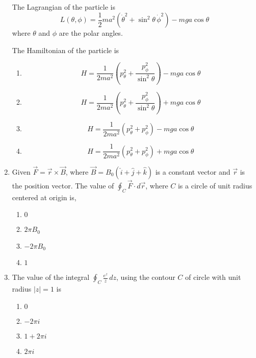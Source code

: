 \documentclass[article]{IEEEtran}
\numberwithin{figure}{enumi}
\begin{document}
\begin{enumerate}
    The Lagrangian of the particle is
    \begin{equation*}
    L(\theta, \phi) = \frac{1}{2} ma^2 \left( \dot{\theta}^2 + \sin^2 \theta \, \dot{\phi}^2 \right) - m g a \cos \theta
    \end{equation*}
    where $\theta$ and $\phi$ are the polar angles.
    
    The Hamiltonian of the particle is
    \begin{enumerate}
        \item 
        \begin{equation*}
        H = \frac{1}{2 m a^2} \left( p_{\theta}^2 + \frac{p_{\phi}^2}{\sin^2 \theta} \right) - m g a \cos \theta
        \end{equation*}
        \item 
        \begin{equation*}
        H = \frac{1}{2 m a^2} \left( p_{\theta}^2 + \frac{p_{\phi}^2}{\sin^2 \theta} \right) + m g a \cos \theta
        \end{equation*}
        \item 
        \begin{equation*}
        H = \frac{1}{2 m a^2} \left( p_{\theta}^2 + p_{\phi}^2 \right) - m g a \cos \theta
        \end{equation*}
        \item 
        \begin{equation*}
        H = \frac{1}{2 m a^2} \left( p_{\theta}^2 + p_{\phi}^2 \right) + m g a \cos \theta
        \end{equation*}
    \end{enumerate}

  

    \item Given $\vec{F} = \vec{r} \times \vec{B}$, where $\vec{B} = B_0 (\hat{i} + \hat{j} + \hat{k})$ is a constant vector and $\vec{r}$ is the position vector. The value of $\oint_C \vec{F} \cdot d\vec{r}$, where $C$ is a circle of unit radius centered at origin is,
    
    \begin{enumerate}
        \item $0$
        \item $2 \pi B_0$
        \item $-2 \pi B_0$
        \item $1$
    \end{enumerate}

    

    \item The value of the integral $\oint_C \frac{e^z}{z} \, dz$, using the contour $C$ of circle with unit radius $|z| = 1$ is
    \begin{enumerate}
        \item $0$
        \item $-2 \pi i$
        \item $1 + 2 \pi i$
        \item $2 \pi i$
    \end{enumerate}


\end{enumerate}
\end{document}
